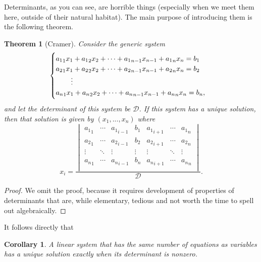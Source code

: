 \documentclass[a4paper,leqno]{article}
\numberwithin{equation}{section}
\newtheorem{thm}[equation]{Theorem}
\newtheorem{cor}[equation]{Corollary}
\theoremstyle{definition}
\theoremstyle{remark}
\begin{document}
Determinants, as you can see, are horrible things (especially when we meet them here, outside of their natural habitat). The main purpose
of introducing them is the following theorem.
\begin{thm}[Cramer]
  Consider the generic system
  \begin{equation*}
    \begin{cases}
      {a_1}_1 x_1 + {a_1}_2 x_2 + \cdots + {a_1}_{n - 1} x_{n - 1} + {a_1}_n x_n = b_1\\
      {a_2}_1 x_1 + {a_2}_2 x_2 + \cdots + {a_2}_{n - 1} x_{n - 1} + {a_2}_n x_n = b_2\\
        \hspace{0.15em}\qquad\vdots\\
      {a_n}_1 x_1 + {a_n}_2 x_2 + \cdots + {a_n}_{n - 1} x_{n - 1} + {a_n}_n x_n = b_n,
    \end{cases}
  \end{equation*}
  and let the determinant of this system be $ \mathcal{D} $.
  If this system has a unique solution, then that solution is given by $ (x_1, ..., x_n) $ where
  \begin{equation}
    x_i = \frac{
      \begin{vmatrix}
        {a_1}_1 & \cdots & {a_1}_{i - 1} & b_1 & {a_1}_{i + 1} & \cdots & {a_1}_n\\
        {a_2}_1 & \cdots & {a_2}_{i - 1} & b_2 & {a_2}_{i + 1} & \cdots & {a_2}_n\\
          \vdots & \ddots & \vdots & \vdots & \vdots & \ddots & \vdots \\
        {a_n}_1 & \cdots & {a_n}_{i - 1} & b_n & {a_n}_{i + 1} & \cdots & {a_n}_n\\
      \end{vmatrix}
    }{\mathcal{D}}.
  \end{equation}
\end{thm}
\begin{proof}
  We omit the proof, because it requires development of properties of determinants that are, while elementary, tedious
  and not worth the time to spell out algebraically.
\end{proof}

It follows directly that
\begin{cor}
  A linear system that has the same number of equations as variables has a unique solution exactly when its determinant is nonzero.
\end{cor}
\end{document}
